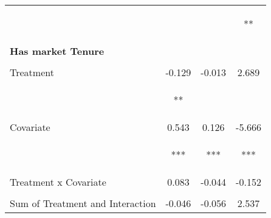 \begin{tabular}{lccc}
 & \begin{footnotesize}[0.047]\end{footnotesize} & \begin{footnotesize}[0.046]\end{footnotesize} & \begin{footnotesize}[1.653]**\end{footnotesize}\\
\noalign{\smallskip}\textbf{Has market Tenure} &  &  & \\
 & \begin{footnotesize}\end{footnotesize} & \begin{footnotesize}\end{footnotesize} & \begin{footnotesize}\end{footnotesize}\\
\noalign{\smallskip}Treatment & -0.129 & -0.013 & 2.689\\
 & \begin{footnotesize}[0.063]**\end{footnotesize} & \begin{footnotesize}[0.050]\end{footnotesize} & \begin{footnotesize}[2.082]\end{footnotesize}\\
\noalign{\smallskip}Covariate & 0.543 & 0.126 & -5.666\\
 & \begin{footnotesize}[0.046]***\end{footnotesize} & \begin{footnotesize}[0.037]***\end{footnotesize} & \begin{footnotesize}[1.644]***\end{footnotesize}\\
\noalign{\smallskip}Treatment x Covariate & 0.083 & -0.044 & -0.152\\
 & \begin{footnotesize}[0.067]\end{footnotesize} & \begin{footnotesize}[0.054]\end{footnotesize} & \begin{footnotesize}[2.303]\end{footnotesize}\\
\noalign{\smallskip}Sum of Treatment and Interaction & -0.046 & -0.056 & 2.537\\

\end{tabular}
